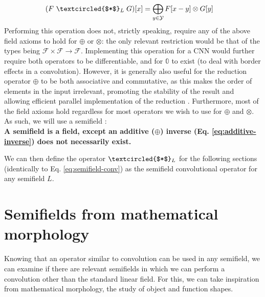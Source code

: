 \documentclass[a4paper, 12pt]{report}
\begin{document}
\begin{align}
	(F ~\textcircled{$*$}_L\; G)[x] &=\bigoplus_{y\in \mathcal{Y}} F[x-y] \otimes G[y] \label{eq:semifield-conv}
\end{align}
\noindent
Performing this operation does not, strictly speaking, require any of the above field axioms to hold for $\oplus$ or $\otimes$: the only relevant restriction would be that of the types being $\mathcal{F}\times\mathcal{F}\rightarrow\mathcal{F}$. Implementing this operation for a CNN would further require both operators to be differentiable, and for $\mathbb{0}$ to exist (to deal with border effects in a convolution). However, it is generally also useful for the reduction operator $\oplus$ to be both associative and commutative, as this makes the order of elements in the input irrelevant, promoting the stability of the result and allowing efficient parallel implementation of the reduction \cite{ppad}. Furthermore, most of the field axioms hold regardless for most operators we wish to use for $\oplus$ and $\otimes$. As such, we will use a semifield \cite{bellaardaxiomatic}:\\
\textbf{
A semifield is a field, except an additive ($\oplus$) inverse (Eq. \ref{eq:additive-inverse}) does not necessarily exist.
}

We can then define the operator $\textcircled{$*$}_L$ for the following sections (identically to Eq. \ref{eq:semifield-conv}) as the semifield convolutional operator for any semifield $L$.

\section{Semifields from mathematical morphology}
Knowing that an operator similar to convolution can be used in any semifield, we can examine if there are relevant semifields in which we can perform a convolution other than the standard linear field. For this, we can take inspiration from mathematical morphology, the study of object and function shapes.
\end{document}
